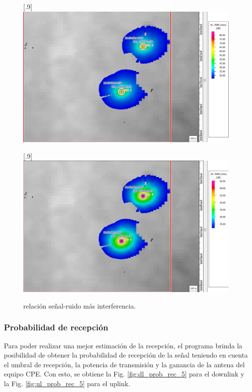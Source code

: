 \documentclass[11pt,a4paper]{article}
\begin{document}
\begin{figure}[ht!]
  \centering
  [.9\linewidth]{\includegraphics[height=14\baselineskip]{fotos_ema/ul_snr_5.jpg}}

  [.9\linewidth]{\includegraphics[height=14\baselineskip]{fotos_ema/dl_snr_5.jpg}}
  \caption{relación señal-ruido más interferencia.}
  \label{fig:snr_5}
\end{figure}



\subsubsection{Probabilidad de recepción}

Para poder realizar una mejor estimación de la recepción, el programa brinda la posibilidad de obtener la probabilidad de recepción de la señal teniendo en cuenta el umbral de recepción, la potencia de transmisión y la ganancia de la antena del equipo CPE. 
Con esto, se obtiene la Fig. \ref{fig:dl_prob_rec_5} para el downlink y la Fig. \ref{fig:ul_prob_rec_5} para el uplink.
\end{document}
